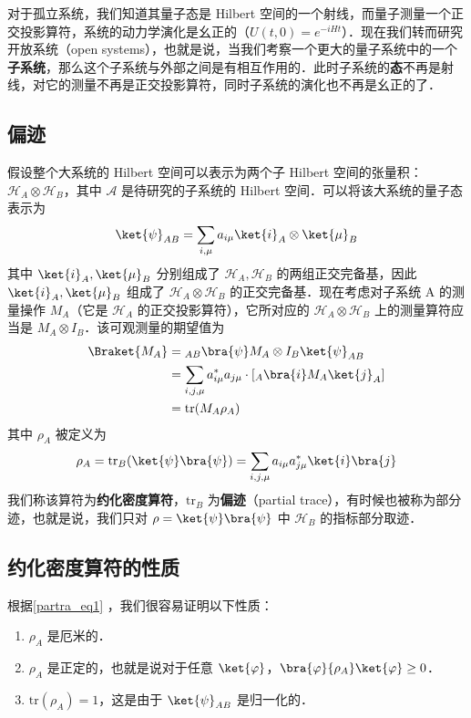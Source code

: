 

对于孤立系统，我们知道其量子态是 Hilbert 空间的一个射线，而量子测量一个正交投影算符，系统的动力学演化是幺正的（$U(t,0)=e^{-iHt}$）．现在我们转而研究开放系统（open systems），也就是说，当我们考察一个更大的量子系统中的一个\textbf{子系统}，那么这个子系统与外部之间是有相互作用的．此时子系统的\textbf{态}不再是射线，对它的测量不再是正交投影算符，同时子系统的演化也不再是幺正的了．
\subsection{偏迹}
假设整个大系统的 Hilbert 空间可以表示为两个子 Hilbert 空间的张量积：$\mathcal{H}_A\otimes \mathcal{H}_B$，其中 $\mathcal A$ 是待研究的子系统的 Hilbert 空间．可以将该大系统的量子态表示为
\begin{equation}
\ket{\psi}_{AB}=\sum_{i,\mu}a_{i\mu}\ket{i}_A\otimes \ket{\mu}_B
\end{equation}
其中 $\ket{i}_A,\ket{\mu}_B$ 分别组成了 $\mathcal{H}_A, \mathcal{H}_B$ 的两组正交完备基，因此 $\ket{i}_A,\ket{\mu}_B$ 组成了 $\mathcal{H}_A\otimes \mathcal{H}_B$ 的正交完备基．现在考虑对子系统 A 的测量操作 $M_A$（它是 $\mathcal H_A$ 的正交投影算符），它所对应的 $\mathcal{H}_A\otimes \mathcal{H}_B$ 上的测量算符应当是 $M_A\otimes I_B$．该可观测量的期望值为
\begin{equation}
\begin{aligned}
\Braket{M_A}&={}_{AB}\bra{\psi}M_A\otimes I_B \ket{\psi}_{AB}\\
&=\sum_{i,j,\mu}a_{i\mu}^*a_{j\mu} \cdot [{}_A\bra{i} M_A \ket{j}_A]\\
&=\text{tr}(M_A \rho_A)
\end{aligned}
\end{equation}
其中 $\rho_A$ 被定义为
\begin{equation}\label{partra_eq1}
\rho_A=\text{tr}_B(\ket{\psi}\bra{\psi})=\sum_{i,j,\mu}a_{i\mu}a_{j\mu}^*\ket{i}\bra{j}
\end{equation}
我们称该算符为\textbf{约化密度算符}，$\text{tr}_B$ 为\textbf{偏迹}（partial trace），有时候也被称为部分迹，也就是说，我们只对 $\rho=\ket{\psi}\bra{\psi}$ 中 $\mathcal{H}_B$ 的指标部分取迹．

\subsection{约化密度算符的性质}
根据\autoref{partra_eq1} ，我们很容易证明以下性质：
\begin{enumerate}
\item $\rho_A$ 是厄米的．
\item $\rho_A$ 是正定的，也就是说对于任意 $\ket{\varphi}$，$\bra{\varphi}{\rho_A}\ket{\varphi}\ge 0$．
\item $\text{tr}(\rho_A)=1$，这是由于 $\ket{\psi}_{AB}$ 是归一化的．
\end{enumerate}

